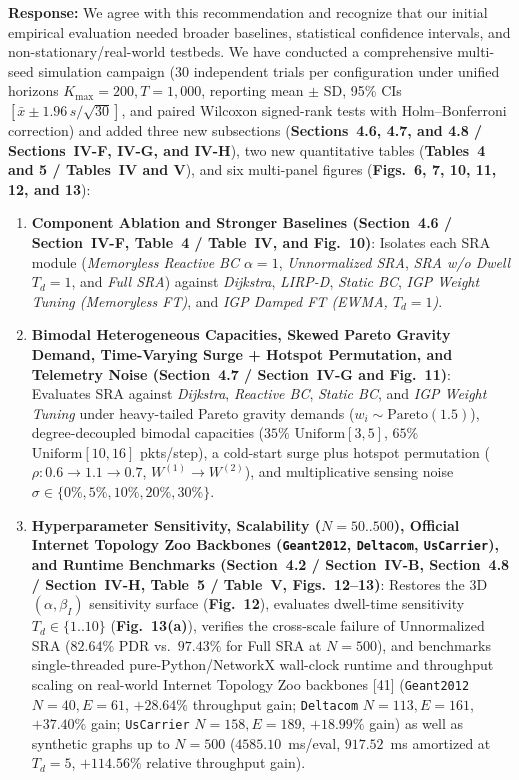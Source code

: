 \documentclass[11pt,a4paper]{article}
\begin{document}
\noindent\textbf{Response:} We agree with this recommendation and recognize that our initial empirical evaluation needed broader baselines, statistical confidence intervals, and non-stationary/real-world testbeds. We have conducted a comprehensive multi-seed simulation campaign (30 independent trials per configuration under unified horizons $K_{\max}=200, T=1{,}000$, reporting mean $\pm$ SD, 95\% CIs $[\bar{x} \pm 1.96\,s/\sqrt{30}]$, and paired Wilcoxon signed-rank tests with Holm--Bonferroni correction) and added three new subsections (\textbf{Sections~4.6, 4.7, and 4.8 / Sections~IV-F, IV-G, and IV-H}), two new quantitative tables (\textbf{Tables~4 and 5 / Tables~IV and V}), and six multi-panel figures (\textbf{Figs.~6, 7, 10, 11, 12, and 13}):
\begin{enumerate}[leftmargin=1.8em]
    \item \textbf{Component Ablation and Stronger Baselines (Section~4.6 / Section~IV-F, Table~4 / Table~IV, and Fig.~10)}: Isolates each SRA module (\textit{Memoryless Reactive BC $\alpha=1$}, \textit{Unnormalized SRA}, \textit{SRA w/o Dwell $T_d=1$}, and \textit{Full SRA}) against \textit{Dijkstra}, \textit{LIRP-D}, \textit{Static BC}, \textit{IGP Weight Tuning (Memoryless FT)}, and \textit{IGP Damped FT (EWMA, $T_d=1$)}.
    \item \textbf{Bimodal Heterogeneous Capacities, Skewed Pareto Gravity Demand, Time-Varying Surge + Hotspot Permutation, and Telemetry Noise (Section~4.7 / Section~IV-G and Fig.~11)}: Evaluates SRA against \textit{Dijkstra}, \textit{Reactive BC}, \textit{Static BC}, and \textit{IGP Weight Tuning} under heavy-tailed Pareto gravity demands ($w_i \sim \mathrm{Pareto}(1.5)$), degree-decoupled bimodal capacities ($35\%$ $\mathrm{Uniform}[3,5]$, $65\%$ $\mathrm{Uniform}[10,16]$ pkts/step), a cold-start surge plus hotspot permutation ($\rho: 0.6 \to 1.1 \to 0.7$, $W^{(1)}\to W^{(2)}$), and multiplicative sensing noise $\sigma \in \{0\%, 5\%, 10\%, 20\%, 30\%\}$.
    \item \textbf{Hyperparameter Sensitivity, Scalability ($N=50..500$), Official Internet Topology Zoo Backbones (\texttt{Geant2012}, \texttt{Deltacom}, \texttt{UsCarrier}), and Runtime Benchmarks (Section~4.2 / Section~IV-B, Section~4.8 / Section~IV-H, Table~5 / Table~V, Figs.~12--13)}: Restores the 3D $(\alpha, \beta_I)$ sensitivity surface (\textbf{Fig.~12}), evaluates dwell-time sensitivity $T_d \in \{1..10\}$ (\textbf{Fig.~13(a)}), verifies the cross-scale failure of Unnormalized SRA ($82.64\%$ PDR vs.\ $97.43\%$ for Full SRA at $N=500$), and benchmarks single-threaded pure-Python/NetworkX wall-clock runtime and throughput scaling on real-world Internet Topology Zoo backbones [41] (\texttt{Geant2012} $N=40, E=61$, $+28.64\%$ throughput gain; \texttt{Deltacom} $N=113, E=161$, $+37.40\%$ gain; \texttt{UsCarrier} $N=158, E=189$, $+18.99\%$ gain) as well as synthetic graphs up to $N=500$ ($4585.10$~ms/eval, $917.52$~ms amortized at $T_d=5$, $+114.56\%$ relative throughput gain).
\end{enumerate}
\end{document}

